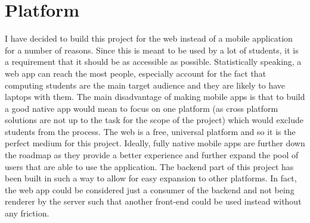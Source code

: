 \section{Platform}
I have decided to build this project for the web instead of a mobile application for a number of reasons. Since this is meant to be used by a lot of students, it is a requirement that it should be as accessible as possible. Statistically speaking, a web app can reach the most people, especially account for the fact that computing students are the main target audience and they are likely to have laptops with them.
The main disadvantage of making mobile apps is that to build a good native app would mean to focus on one platform (as cross platform solutions are not up to the task for the scope of the project) which would exclude students from the process. The web is a free, universal platform and so it is the perfect medium for this project.
Ideally, fully native mobile apps are further down the roadmap as they provide a better experience and further expand the pool of users that are able to use the application.
The backend part of this project has been built in such a way to allow for easy expansion to other platforms. In fact, the web app could be considered just a consumer of the backend and not being renderer by the server such that another front-end could be used instead without any friction.

